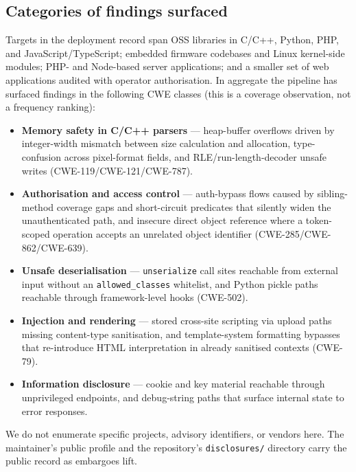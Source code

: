 \documentclass[11pt,a4paper]{article}
\begin{document}
\subsection{Categories of findings surfaced}
\label{sec:eval-categories}

Targets in the deployment record span OSS libraries in C/C++, Python,
PHP, and JavaScript/TypeScript; embedded firmware codebases and Linux
kernel-side modules; PHP- and Node-based server applications; and a
smaller set of web applications audited with operator authorisation. In
aggregate the pipeline has surfaced findings in the following CWE
classes (this is a coverage observation, not a frequency ranking):

\begin{itemize}[leftmargin=14pt]
  \item \textbf{Memory safety in C/C++ parsers} — heap-buffer overflows
  driven by integer-width mismatch between size calculation and
  allocation, type-confusion across pixel-format fields, and
  RLE/run-length-decoder unsafe writes (CWE-119/CWE-121/CWE-787).
  \item \textbf{Authorisation and access control} — auth-bypass flows
  caused by sibling-method coverage gaps and short-circuit predicates that
  silently widen the unauthenticated path, and insecure direct object
  reference where a token-scoped operation accepts an unrelated object
  identifier (CWE-285/CWE-862/CWE-639).
  \item \textbf{Unsafe deserialisation} — \texttt{unserialize} call sites
  reachable from external input without an \texttt{allowed\_classes}
  whitelist, and Python pickle paths reachable through framework-level
  hooks (CWE-502).
  \item \textbf{Injection and rendering} — stored cross-site scripting via
  upload paths missing content-type sanitisation, and template-system
  formatting bypasses that re-introduce HTML interpretation in already
  sanitised contexts (CWE-79).
  \item \textbf{Information disclosure} — cookie and key material reachable
  through unprivileged endpoints, and debug-string paths that surface
  internal state to error responses.
\end{itemize}

\noindent
We do not enumerate specific projects, advisory identifiers, or vendors
here. The maintainer's public profile and the repository's
\texttt{disclosures/} directory carry the public record as embargoes lift.
\end{document}
